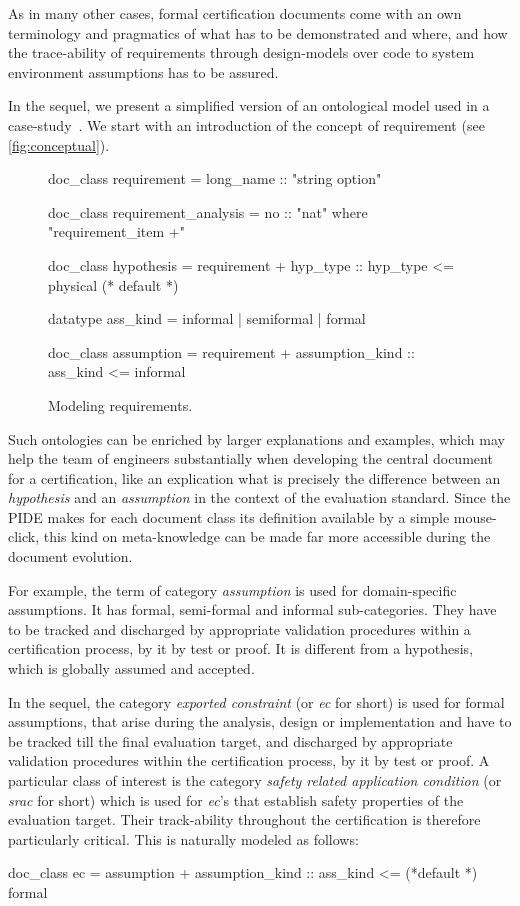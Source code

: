 \begin{isabellebody}
\begin{isamarkuptext}
As in many other cases, formal certification documents come with an own terminology and
pragmatics of what has to be demonstrated and where, and how the trace-ability of requirements through
design-models over code to system environment assumptions has to be assured.%
\end{isamarkuptext}\isamarkuptrue%
%
\begin{isamarkuptext}%
In the sequel, we present a simplified version of an ontological model used in a 
case-study~\cite{bezzecchi.ea:making:2018}. We start with an introduction of the concept of requirement 
(see \autoref{fig:conceptual}). 
\begin{figure}
\begin{isar}
doc_class requirement = long_name :: "string option"

doc_class requirement_analysis = no :: "nat"
   where "requirement_item +"

doc_class hypothesis = requirement +
      hyp_type :: hyp_type <= physical  (* default *)
  
datatype ass_kind = informal | semiformal | formal
  
doc_class assumption = requirement +
     assumption_kind :: ass_kind <= informal 
\end{isar}
\caption{Modeling requirements.}
\label{fig:conceptual}
\end{figure}
Such ontologies can be enriched by larger explanations and examples, which may help
the team of engineers substantially when developing the central document for a certification, 
like an explication what is precisely the difference between an \emph{hypothesis} and an 
\emph{assumption} in the context of the evaluation standard. Since the PIDE makes for each 
document class its definition available by a simple mouse-click, this kind on meta-knowledge 
can be made far more accessible during the document evolution.

For example, the term of category \emph{assumption} is used for domain-specific assumptions. 
It has formal, semi-formal and informal sub-categories. They have to be 
tracked and discharged by appropriate validation procedures within a 
certification process, by it by test or proof. It is different from a hypothesis, which is
globally assumed and accepted.

 In the sequel, the category \emph{exported constraint} (or \emph{ec} for short)
is used for formal assumptions, that arise during the analysis,
design or implementation and have to be tracked till the final
evaluation target, and discharged by appropriate validation procedures 
within the certification process, by it by test or proof.  A particular class of interest 
is the category \emph{safety related application condition} (or \emph{srac} 
for short) which is used for \emph{ec}'s that establish safety properties
of the evaluation target. Their track-ability throughout the certification
is therefore particularly critical. This is naturally modeled as follows:
\begin{isar}  
doc_class ec = assumption  +
     assumption_kind :: ass_kind <= (*default *) formal
                        

\end{isar}
\end{isamarkuptext}
\end{isabellebody}

